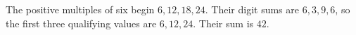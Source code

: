 The positive multiples of six begin $6,12,18,24$. Their digit sums are $6,3,9,6$, so the first three qualifying values are $6,12,24$. Their sum is $\boxed{42}$.
